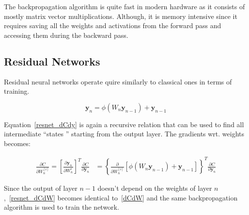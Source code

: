\documentclass{article}
\begin{document}
    The backpropagation algorithm is quite fast in modern hardware as it consists of mostly matrix vector multiplications.
    Although, it is memory intensive since it requires saving all the weights and activations from the forward pass and accessing them during the backward pass.

    \subsection{Residual Networks}
    Residual neural networks operate quire similarly to classical ones in terms of training.

    \begin{equation}
        \bm{y}_{n} = \phi( W_{n} \bm{y}_{n-1} ) + \bm{y}_{n-1}
    \end{equation}


    Equation~\eqref{resnet_dCdy} is again a recursive relation that can be used to find all intermediate ``states '' starting from the output layer.
    The gradients wrt.
    weights becomes:

    \begin{align}
        \frac{ \partial C}{\partial W_n^{[i]} }
        =
        \left[ \frac{ \partial \pmb{y}_{n}}{\partial W_n^i } \right]^T
        \frac{ \partial C}{\partial \pmb{y}_{n} }
        &=
        \left\{
        \frac{ \partial }{\partial W_n^{[i]} }
        \left[
            \phi( W_{n} \bm{y}_{n-1} )  + \textbf{y}_{n-1}
            \right]
        \right\}^T
        \frac{ \partial C}{\partial \pmb{y}_{n} }
        \label{resnet_dCdW}
    \end{align}

    Since the output of layer $n-1$ doesn't depend on the weights of layer $n$,~\eqref{resnet_dCdW} becomes identical to~\eqref{dCdW} and the same backpropagation algorithm is used to train the network.
\end{document}
